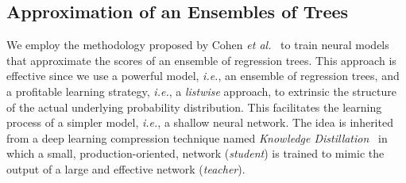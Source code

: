\subsection{Approximation of an Ensembles of Trees}
\label{subsec:approxbetter}
We employ the methodology proposed by Cohen \textit{et al.}~\cite{cohen2018universal} to train neural models that approximate the scores of an ensemble of regression trees. This approach is effective since we use a powerful model, \textit{i.e.}, an ensemble of regression trees, and a profitable learning strategy, \textit{i.e.}, a \textit{listwise} approach, to extrinsic the structure of the actual underlying probability distribution. This facilitates the learning process of a simpler model, \textit{i.e.}, a shallow neural network. The idea is inherited from a deep learning compression technique named \textit{Knowledge Distillation}~\cite{bucilua2006model, ba2014deep,DBLP:journals/corr/HintonVD15} in which a small, production-oriented, network (\textit{student}) is trained to mimic the output of a large and effective network (\textit{teacher}).

